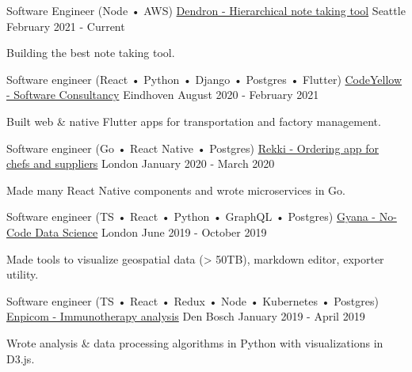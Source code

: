 

\begin{cventries}

  \cventry
    {Software Engineer (Node • AWS)}
    {\href{https://dendron.so}{Dendron - Hierarchical note taking tool}}
    {Seattle}
    {February 2021 - Current}
     {
      \begin{cvitems}
        \item {Building the best note taking tool.}
      \end{cvitems}
    }

  \cventry
    {Software engineer (React • Python • Django • Postgres • Flutter)}
    {\href{https://codeyellow.nl}{CodeYellow - Software Consultancy}}
    {Eindhoven}
    {August 2020 - February 2021}
     {
      \begin{cvitems}
        \item {Built web \& native Flutter apps for transportation and factory management.}
      \end{cvitems}
    }

  \cventry
    {Software engineer (Go • React Native • Postgres)}
    {\href{https://www.rekki.com}{Rekki - Ordering app for chefs and suppliers}}
    {London}
    {January 2020 - March 2020}
     {
      \begin{cvitems}
        \item {Made many React Native components and wrote microservices in Go.}
      \end{cvitems}
    }

  \cventry
    {Software engineer (TS • React • Python • GraphQL • Postgres)}
    {\href{https://www.gyana.com}{Gyana - No-Code Data Science}}
    {London}
    {June 2019 - October 2019}
     {
      \begin{cvitems}
        \item {Made tools to visualize geospatial data (> 50TB), markdown editor, exporter utility.}
      \end{cvitems}
    }

  \cventry
    {Software engineer (TS • React • Redux • Node • Kubernetes • Postgres)}
    {\href{https://www.enpicom.com}{Enpicom - Immunotherapy analysis}}
    {Den Bosch}
    {January 2019 - April 2019}
     {
      \begin{cvitems}
        \item {Wrote analysis \& data processing algorithms in Python with visualizations in D3.js.}
      \end{cvitems}
    }


\end{cventries}

